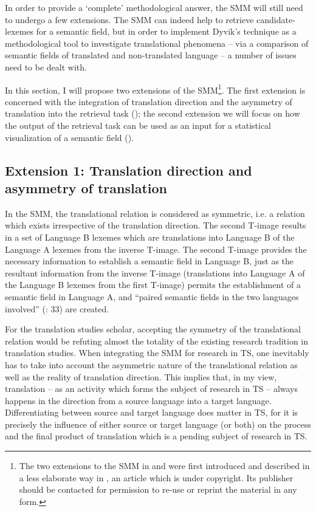 In order to provide a ‘complete’ methodological answer, the SMM will still need to undergo a few extensions. The SMM can indeed help to retrieve candidate-lexemes for a semantic field, but in order to implement Dyvik’s technique as a methodological tool to investigate translational phenomena – via a comparison of semantic fields of translated and non-translated language – a number of issues need to be dealt with.



In this section, I will propose two extensions of the SMM\footnote{The two extensions to the SMM in  and  were first introduced and described in a less elaborate way in \citet{vandevoorde_corpus-based_2017}, an article which is under copyright. Its publisher should be contacted for permission to re-use or reprint the material in any form.}. The first extension is concerned with the integration of translation direction and the asymmetry of translation into the retrieval task (); the second extension we will focus on how the output of the retrieval task can be used as an input for a statistical visualization of a semantic field ().


\subsection{\label{sec:3.5.1}  Extension 1: Translation direction and asymmetry of translation}

In the SMM, the translational relation is considered as symmetric, i.e. a relation which exists irrespective of the translation direction. The second T-image results in a set of Language B lexemes which are translations into Language B of the Language A lexemes from the inverse T-image. The second T-image provides the necessary information to establish a semantic field in Language B, just as the resultant information from the inverse T-image (translations into Language A of the Language B lexemes from the first T-image) permits the establishment of a semantic field in Language A, and “paired semantic fields in the two languages involved” (\citealt{langemets_translations_2005}: 33) are created.



For the translation studies scholar, accepting the symmetry of the translational relation would be refuting almost the totality of the existing research tradition in translation studies. When integrating the SMM for research in TS, one inevitably has to take into account the asymmetric nature of the translational relation as well as the reality of translation direction. This implies that, in my view, translation – as an activity which forms the subject of research in TS – always happens in the direction from a source language into a target language. Differentiating between source and target language does matter in TS, for it is precisely the influence of either source or target language (or both) on the process and the final product of translation which is a pending subject of research in TS.



